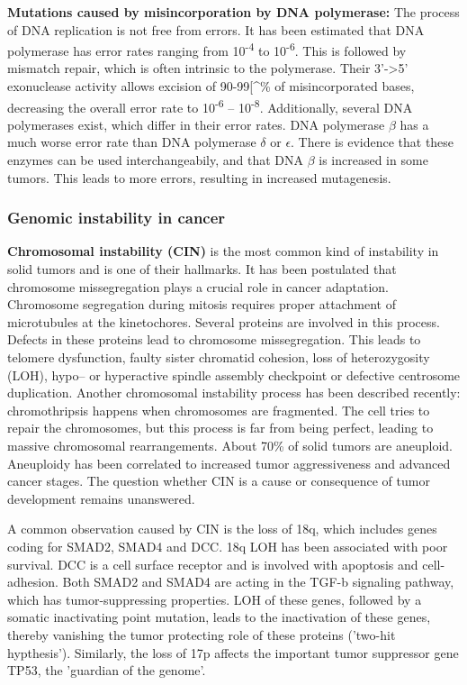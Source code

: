     \textbf{Mutations caused by misincorporation by DNA polymerase:} The process
    of DNA replication is not free from errors. It has been estimated that DNA
    polymerase has error rates ranging from 10\textsuperscript{-4} to
    10\textsuperscript{-6}. This is followed by mismatch repair, which is often
    intrinsic to the polymerase. Their 3'->5' exonuclease activity allows
    excision of 90-99[^\% of misincorporated bases, decreasing the overall error
    rate to 10\textsuperscript{-6} -- 10\textsuperscript{-8}. Additionally,
    several DNA polymerases exist, which differ in their error rates. DNA
    polymerase $\beta$ has a much worse error rate than DNA polymerase $\delta$
    or $\epsilon$. There is evidence that these enzymes can be used
    interchangeabily, and that DNA $\beta$ is increased in some tumors. This
    leads to more errors, resulting in increased mutagenesis.

    \subsubsection{Genomic instability in cancer}

      \textbf{Chromosomal instability (CIN)} is the most common kind of
      instability in solid tumors and is one of their hallmarks. It has been
      postulated that chromosome missegregation plays a crucial role in cancer
      adaptation. Chromosome segregation during mitosis requires proper
      attachment of microtubules at the kinetochores. Several proteins are
      involved in this process. Defects in these proteins lead to chromosome
      missegregation. This leads to telomere dysfunction,  faulty sister
      chromatid cohesion, loss of heterozygosity (LOH), hypo-- or hyperactive
      spindle assembly checkpoint or defective centrosome duplication. Another
      chromosomal instability process has been described recently:
      chromothripsis happens when chromosomes are fragmented. The cell tries to
      repair the chromosomes, but this process is far from being perfect,
      leading to massive chromosomal rearrangements. About 70\% of solid tumors
      are aneuploid. Aneuploidy has been correlated to increased tumor
      aggressiveness and advanced cancer stages. The question whether CIN is a
      cause or consequence of tumor development remains unanswered.

      A common observation caused by CIN is the loss of 18q, which includes
      genes coding for SMAD2, SMAD4 and DCC. 18q LOH has been associated
      with poor survival. DCC is a cell surface receptor and
      is involved with apoptosis and cell-adhesion. Both SMAD2 and SMAD4 are acting
      in the TGF-b signaling pathway, which has tumor-suppressing properties.
      LOH of these genes, followed by a somatic inactivating point mutation,
      leads to the inactivation of these genes, thereby vanishing the
      tumor protecting role of these proteins ('two-hit hypthesis'). Similarly,
      the loss of 17p affects the important tumor suppressor gene TP53,
      the 'guardian of the genome'.


